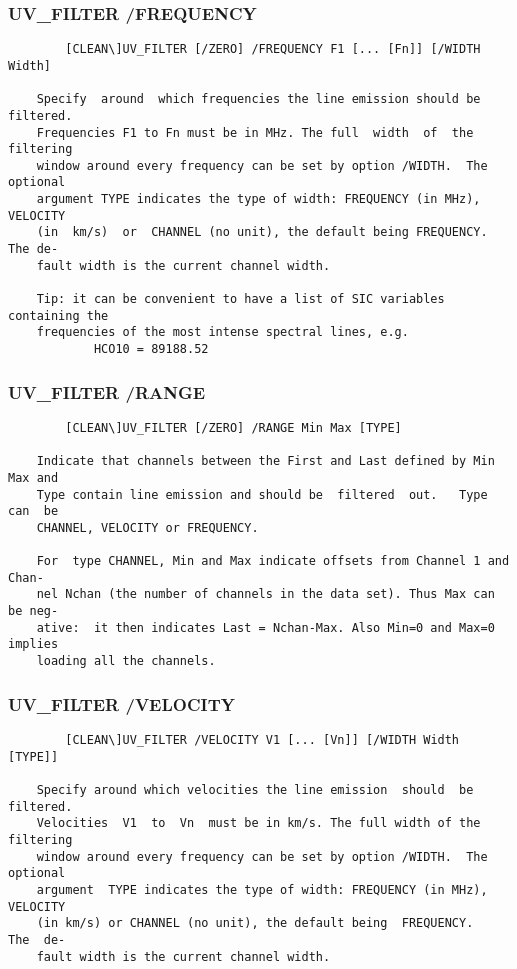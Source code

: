 \subsubsection{UV\_FILTER /FREQUENCY}
\begin{verbatim}
        [CLEAN\]UV_FILTER [/ZERO] /FREQUENCY F1 [... [Fn]] [/WIDTH Width]

    Specify  around  which frequencies the line emission should be filtered.
    Frequencies F1 to Fn must be in MHz. The full  width  of  the  filtering
    window around every frequency can be set by option /WIDTH.  The optional
    argument TYPE indicates the type of width: FREQUENCY (in MHz),  VELOCITY
    (in  km/s)  or  CHANNEL (no unit), the default being FREQUENCY.  The de-
    fault width is the current channel width.

    Tip: it can be convenient to have a list of SIC variables containing the
    frequencies of the most intense spectral lines, e.g.
            HCO10 = 89188.52

\end{verbatim}
\subsubsection{UV\_FILTER /RANGE}
\begin{verbatim}
        [CLEAN\]UV_FILTER [/ZERO] /RANGE Min Max [TYPE]

    Indicate that channels between the First and Last defined by Min Max and
    Type contain line emission and should be  filtered  out.   Type  can  be
    CHANNEL, VELOCITY or FREQUENCY.

    For  type CHANNEL, Min and Max indicate offsets from Channel 1 and Chan-
    nel Nchan (the number of channels in the data set). Thus Max can be neg-
    ative:  it then indicates Last = Nchan-Max. Also Min=0 and Max=0 implies
    loading all the channels.

\end{verbatim}
\subsubsection{UV\_FILTER /VELOCITY}
\begin{verbatim}
        [CLEAN\]UV_FILTER /VELOCITY V1 [... [Vn]] [/WIDTH Width [TYPE]]

    Specify around which velocities the line emission  should  be  filtered.
    Velocities  V1  to  Vn  must be in km/s. The full width of the filtering
    window around every frequency can be set by option /WIDTH.  The optional
    argument  TYPE indicates the type of width: FREQUENCY (in MHz), VELOCITY
    (in km/s) or CHANNEL (no unit), the default being  FREQUENCY.   The  de-
    fault width is the current channel width.

\end{verbatim}
